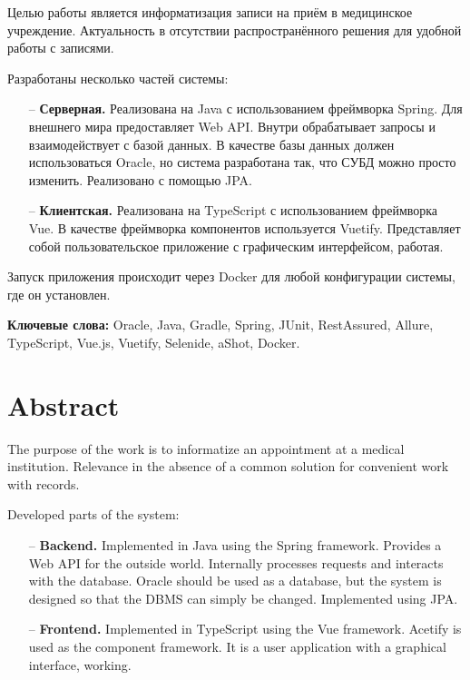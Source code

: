 \documentclass[a4paper,article]{article}
\begin{document}
\begin{sloppypar}
    Целью работы является информатизация записи на приём в медицинское учреждение. Актуальность в отсутствии распространённого решения для удобной работы с записями.

    Разработаны несколько частей системы:

    \begin{itemize}[nolistsep]
		\item[--] \textbf{Серверная.} Реализована на Java с использованием фреймворка Spring. Для внешнего мира предоставляет Web API. Внутри обрабатывает запросы и взаимодействует с базой данных. В качестве базы данных должен использоваться Oracle, но система разработана так, что СУБД можно просто изменить. Реализовано с помощью JPA.
		\item[--] \textbf{Клиентская.} Реализована на TypeScript с использованием фреймворка Vue. В качестве фреймворка компонентов используется Vuetify. Представляет собой пользовательское приложение с графическим интерфейсом, работая.
	\end{itemize}

	Запуск приложения происходит через Docker для любой конфигурации системы, где он установлен.

	\textbf{Ключевые слова:} Oracle, Java, Gradle, Spring, JUnit, RestAssured, Allure, TypeScript, Vue.js, Vuetify, Selenide, aShot, Docker.


    \newpage

    \section*{Abstract}
    

    The purpose of the work is to informatize an appointment at a medical institution. Relevance in the absence of a common solution for convenient work with records.

    Developed parts of the system:

    \begin{itemize}[nolistsep]
        \item[--] \textbf{Backend.} Implemented in Java using the Spring framework. Provides a Web API for the outside world. Internally processes requests and interacts with the database. Oracle should be used as a database, but the system is designed so that the DBMS can simply be changed. Implemented using JPA.
        \item[--] \textbf{Frontend.} Implemented in TypeScript using the Vue framework. Acetify is used as the component framework. It is a user application with a graphical interface, working.
    \end{itemize}


\end{sloppypar}
\end{document}
